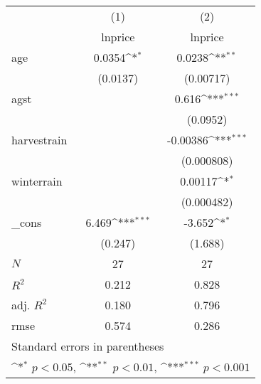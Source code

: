 {
\def\sym#1{\ifmmode^{#1}\else\(^{#1}\)\fi}
\begin{tabular}{l*{2}{c}}
\hline\hline
            &\multicolumn{1}{c}{(1)}&\multicolumn{1}{c}{(2)}\\
            &\multicolumn{1}{c}{lnprice}&\multicolumn{1}{c}{lnprice}\\
\hline
age         &      0.0354\sym{*}  &      0.0238\sym{**} \\
            &    (0.0137)         &   (0.00717)         \\
[1em]
agst        &                     &       0.616\sym{***}\\
            &                     &    (0.0952)         \\
[1em]
harvestrain &                     &    -0.00386\sym{***}\\
            &                     &  (0.000808)         \\
[1em]
winterrain  &                     &     0.00117\sym{*}  \\
            &                     &  (0.000482)         \\
[1em]
\_cons      &       6.469\sym{***}&      -3.652\sym{*}  \\
            &     (0.247)         &     (1.688)         \\
\hline
\(N\)       &          27         &          27         \\
\(R^{2}\)   &       0.212         &       0.828         \\
adj. \(R^{2}\)&       0.180         &       0.796         \\
rmse        &       0.574         &       0.286         \\
\hline\hline
\multicolumn{3}{l}{\footnotesize Standard errors in parentheses}\\
\multicolumn{3}{l}{\footnotesize \sym{*} \(p<0.05\), \sym{**} \(p<0.01\), \sym{***} \(p<0.001\)}\\
\end{tabular}
}
